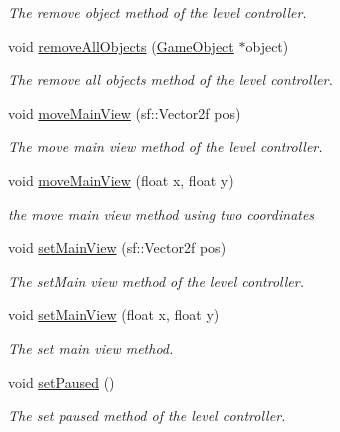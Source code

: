 \begin{DoxyCompactItemize}
\begin{DoxyCompactList}\small\item\em The remove object method of the level controller. \end{DoxyCompactList}\item 
void \hyperlink{class_level_controller_a3f33f48f2476ad4a68ad5880ea02db22}{remove\+All\+Objects} (\hyperlink{class_game_object}{Game\+Object} $\ast$object)
\begin{DoxyCompactList}\small\item\em The remove all objects method of the level controller. \end{DoxyCompactList}\item 
void \hyperlink{class_level_controller_abd5d6b2ae138b8e086e890fddf46ccef}{move\+Main\+View} (sf\+::\+Vector2f pos)
\begin{DoxyCompactList}\small\item\em The move main view method of the level controller. \end{DoxyCompactList}\item 
void \hyperlink{class_level_controller_a02c383a82a966cb4c0a53d571e771016}{move\+Main\+View} (float x, float y)
\begin{DoxyCompactList}\small\item\em the move main view method using two coordinates \end{DoxyCompactList}\item 
void \hyperlink{class_level_controller_a18cdb3e6d6f3d6e9dde4de2c21bc99cf}{set\+Main\+View} (sf\+::\+Vector2f pos)
\begin{DoxyCompactList}\small\item\em The set\+Main view method of the level controller. \end{DoxyCompactList}\item 
void \hyperlink{class_level_controller_a60cba41df915fcfa0fbb4bff105923e0}{set\+Main\+View} (float x, float y)
\begin{DoxyCompactList}\small\item\em The set main view method. \end{DoxyCompactList}\item 
void \hyperlink{class_level_controller_a57e12d591397a1ab9c2641abf2b5fa9d}{set\+Paused} ()
\begin{DoxyCompactList}\small\item\em The set paused method of the level controller. \end{DoxyCompactList}\item 

\end{DoxyCompactItemize}
